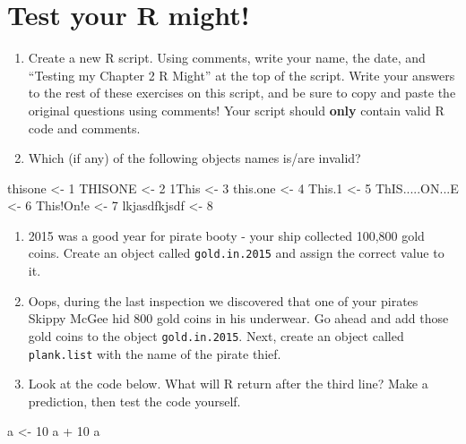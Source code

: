 \documentclass[]{book}
\newenvironment{Shaded}{\begin{snugshade}}{\end{snugshade}}
\newcommand{\DecValTok}[1]{\textcolor[rgb]{0.00,0.00,0.81}{{#1}}}
\newcommand{\FloatTok}[1]{\textcolor[rgb]{0.00,0.00,0.81}{{#1}}}
\newcommand{\StringTok}[1]{\textcolor[rgb]{0.31,0.60,0.02}{{#1}}}
\newcommand{\NormalTok}[1]{{#1}}
\theoremstyle{definition}
\theoremstyle{definition}
\theoremstyle{remark}
\begin{document}
\section{Test your R might!}\label{test-your-r-might}

\begin{enumerate}
\def\labelenumi{\arabic{enumi}.}
\item
  Create a new R script. Using comments, write your name, the date, and
  ``Testing my Chapter 2 R Might'' at the top of the script. Write your
  answers to the rest of these exercises on this script, and be sure to
  copy and paste the original questions using comments! Your script
  should \textbf{only} contain valid R code and comments.
\item
  Which (if any) of the following objects names is/are invalid?
\end{enumerate}

\begin{Shaded}
\begin{Highlighting}[]
\NormalTok{thisone <-}\StringTok{ }\DecValTok{1}
\NormalTok{THISONE <-}\StringTok{ }\DecValTok{2}
\NormalTok{1This <-}\StringTok{ }\DecValTok{3}
\NormalTok{this.one <-}\StringTok{ }\DecValTok{4}
\NormalTok{This}\FloatTok{.1} \NormalTok{<-}\StringTok{ }\DecValTok{5}
\NormalTok{ThIS.....ON...E <-}\StringTok{ }\DecValTok{6}
\NormalTok{This!On!e <-}\StringTok{ }\DecValTok{7}
\NormalTok{lkjasdfkjsdf <-}\StringTok{ }\DecValTok{8}
\end{Highlighting}
\end{Shaded}

\begin{enumerate}
\def\labelenumi{\arabic{enumi}.}
\setcounter{enumi}{2}
\item
  2015 was a good year for pirate booty - your ship collected 100,800
  gold coins. Create an object called \texttt{gold.in.2015} and assign
  the correct value to it.
\item
  Oops, during the last inspection we discovered that one of your
  pirates Skippy McGee hid 800 gold coins in his underwear. Go ahead and
  add those gold coins to the object \texttt{gold.in.2015}. Next, create
  an object called \texttt{plank.list} with the name of the pirate
  thief.
\item
  Look at the code below. What will R return after the third line? Make
  a prediction, then test the code yourself.
\end{enumerate}

\begin{Shaded}
\begin{Highlighting}[]
\NormalTok{a <-}\StringTok{ }\DecValTok{10}
\NormalTok{a +}\StringTok{ }\DecValTok{10}
\NormalTok{a}
\end{Highlighting}
\end{Shaded}
\end{document}
